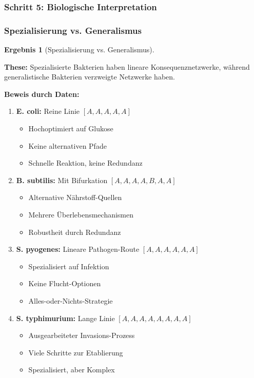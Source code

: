 \documentclass[a4paper,12pt]{article}
\theoremstyle{definition}
\newtheorem{ergebnis}{Ergebnis}
\begin{document}
\subsubsection{Schritt 5: Biologische Interpretation}

\subsubsection{Spezialisierung vs. Generalismus}

\begin{ergebnis}[Spezialisierung vs. Generalismus]
\label{erg:spezialisierung}

\textbf{These:} Spezialisierte Bakterien haben lineare Konsequenznetzwerke, während generalistische Bakterien verzweigte Netzwerke haben.

\textbf{Beweis durch Daten:}

\begin{enumerate}
    \item \textbf{E. coli:} Reine Linie $[A,A,A,A,A]$
    \begin{itemize}
        \item Hochoptimiert auf Glukose
        \item Keine alternativen Pfade
        \item Schnelle Reaktion, keine Redundanz
    \end{itemize}
    
    \item \textbf{B. subtilis:} Mit Bifurkation $[A,A,A,A,B,A,A]$
    \begin{itemize}
        \item Alternative Nährstoff-Quellen
        \item Mehrere Überlebensmechanismen
        \item Robustheit durch Redundanz
    \end{itemize}
    
    \item \textbf{S. pyogenes:} Lineare Pathogen-Route $[A,A,A,A,A,A]$
    \begin{itemize}
        \item Spezialisiert auf Infektion
        \item Keine Flucht-Optionen
        \item Alles-oder-Nichts-Strategie
    \end{itemize}
    
    \item \textbf{S. typhimurium:} Lange Linie $[A,A,A,A,A,A,A,A]$
    \begin{itemize}
        \item Ausgearbeiteter Invasions-Prozess
        \item Viele Schritte zur Etablierung
        \item Spezialisiert, aber Komplex
    \end{itemize}
\end{enumerate}

\end{ergebnis}
\end{document}
